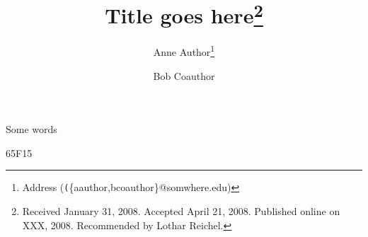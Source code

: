 \documentclass[final]{siamltex}
\title{Title goes here\thanks{
    Received January 31, 2008.
    Accepted April 21, 2008.
    Published online on XXX, 2008.
    Recommended by Lothar Reichel.
}}
\author{Anne Author\thanks{Address
    (\texttt(\{aauthor,bcoauthor\}@somwhere.edu)}
  \and Bob Coauthor\footnotemark[2]}
\begin{document}
\maketitle


\begin{abstract}
\end{abstract}

\begin{keywords}
Some words
\end{keywords}

\begin{AMS}
65F15
\end{AMS}

\pagestyle{myheadings}
\thispagestyle{plain} 




\end{document}
